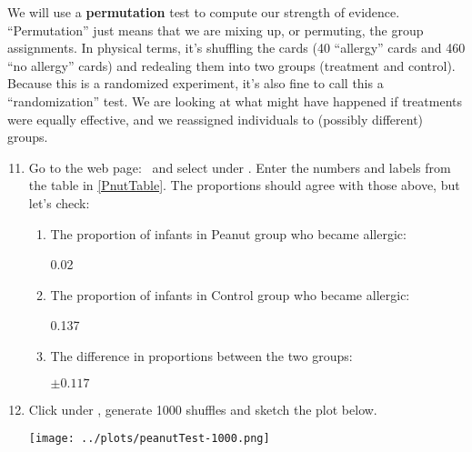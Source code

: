    We will use a {\bf permutation} test to compute our strength of
   evidence. ``Permutation''  just means that we are mixing up, or
   permuting, the group assignments.  In physical terms, it's
   shuffling the cards (40 ``allergy'' cards and 460 ``no allergy''
   cards)  and redealing them into two groups (treatment and control).
   Because  this is a randomized experiment, it's also fine to call this a
   ``randomization'' test.  We are looking at what might have happened
   if treatments were equally effective, and we reassigned individuals
   to (possibly different) groups.
 \begin{enumerate}
  \setcounter{enumi}{10}
   \item Go to the  web page:   \webAppURLFrst\ 
   and select  under  .
   Enter the numbers and labels from the table in \ref{PnutTable}.
   The proportions should agree with those above, but let's check:
   \begin{enumerate}
   \item 
     The proportion of infants in Peanut group who became allergic: \\ 
\begin{key}
 0.02       
\end{key}
   \item The proportion of infants in Control group who became allergic: \\ 
\begin{key}
 0.137       
\end{key}
\item The difference in proportions between the two groups: 
\begin{students}
\vspace{1cm}
\end{students}

\begin{key}
  {\it $ \pm 0.117$ }
\end{key}
\end{enumerate}

   \item  Click  under ,  generate  1000
     shuffles and sketch the plot below. 
\begin{students}
\vspace{4cm}
\end{students}

\begin{key}
  \texttt{[image: ../plots/peanutTest-1000.png]}
\end{key}


\end{enumerate}
